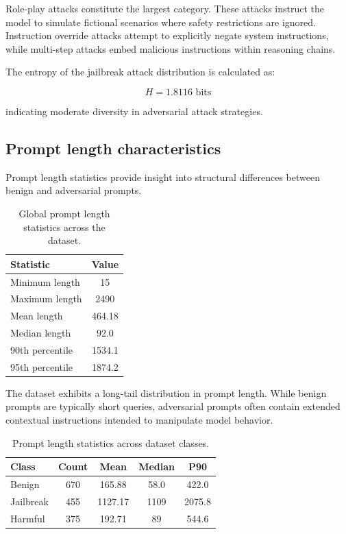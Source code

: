 \documentclass[11pt]{article}
\begin{document}
Role-play attacks constitute the largest category. These attacks instruct the model to simulate fictional scenarios where safety restrictions are ignored. Instruction override attacks attempt to explicitly negate system instructions, while multi-step attacks embed malicious instructions within reasoning chains.

The entropy of the jailbreak attack distribution is calculated as:

\[
H = 1.8116 \text{ bits}
\]

indicating moderate diversity in adversarial attack strategies.


\subsection{Prompt length characteristics}

Prompt length statistics provide insight into structural differences between benign and adversarial prompts.

\begin{table}[h]
\centering
\begin{tabular}{lc}
\toprule
Statistic & Value \\
\midrule
Minimum length & 15 \\
Maximum length & 2490 \\
Mean length & 464.18 \\
Median length & 92.0 \\
90th percentile & 1534.1 \\
95th percentile & 1874.2 \\
\bottomrule
\end{tabular}
\caption{Global prompt length statistics across the dataset.}
\label{tab:length_global}
\end{table}

The dataset exhibits a long-tail distribution in prompt length. While benign prompts are typically short queries, adversarial prompts often contain extended contextual instructions intended to manipulate model behavior.

\begin{table}[h]
\centering
\begin{tabular}{lcccc}
\toprule
Class & Count & Mean & Median & P90 \\
\midrule
Benign & 670 & 165.88 & 58.0 & 422.0 \\
Jailbreak & 455 & 1127.17 & 1109 & 2075.8 \\
Harmful & 375 & 192.71 & 89 & 544.6 \\
\bottomrule
\end{tabular}
\caption{Prompt length statistics across dataset classes.}
\label{tab:length_class}
\end{table}
\end{document}
